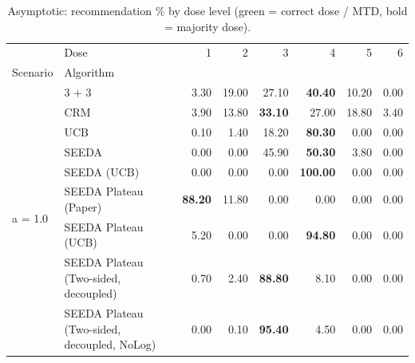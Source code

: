 \begin{table}[H]
\centering
\caption{Asymptotic: recommendation \% by dose level (green = correct dose / MTD, bold = majority dose).}
\label{tab:asym_rec_by_dose}
\begin{tabular}{llrrrrrr}
\toprule
 & Dose & 1 & 2 & 3 & 4 & 5 & 6 \\
Scenario & Algorithm &  &  &  &  &  &  \\
\midrule
\multirow[c]{9}{*}{a = 1.0} & 3 + 3 & 3.30 & 19.00 & {\cellcolor[HTML]{C8E6C9}} 27.10 & \bfseries 40.40 & 10.20 & 0.00 \\
 & CRM & 3.90 & 13.80 & {\cellcolor[HTML]{C8E6C9}} \bfseries 33.10 & 27.00 & 18.80 & 3.40 \\
 & UCB & 0.10 & 1.40 & {\cellcolor[HTML]{C8E6C9}} 18.20 & \bfseries 80.30 & 0.00 & 0.00 \\
 & SEEDA & 0.00 & 0.00 & {\cellcolor[HTML]{C8E6C9}} 45.90 & \bfseries 50.30 & 3.80 & 0.00 \\
 & SEEDA (UCB) & 0.00 & 0.00 & {\cellcolor[HTML]{C8E6C9}} 0.00 & \bfseries 100.00 & 0.00 & 0.00 \\
 & SEEDA Plateau (Paper) & \bfseries 88.20 & 11.80 & {\cellcolor[HTML]{C8E6C9}} 0.00 & 0.00 & 0.00 & 0.00 \\
 & SEEDA Plateau (UCB) & 5.20 & 0.00 & {\cellcolor[HTML]{C8E6C9}} 0.00 & \bfseries 94.80 & 0.00 & 0.00 \\
 & SEEDA Plateau (Two-sided, decoupled) & 0.70 & 2.40 & {\cellcolor[HTML]{C8E6C9}} \bfseries 88.80 & 8.10 & 0.00 & 0.00 \\
 & SEEDA Plateau (Two-sided, decoupled, NoLog) & 0.00 & 0.10 & {\cellcolor[HTML]{C8E6C9}} \bfseries 95.40 & 4.50 & 0.00 & 0.00 \\
\bottomrule
\end{tabular}
\end{table}
